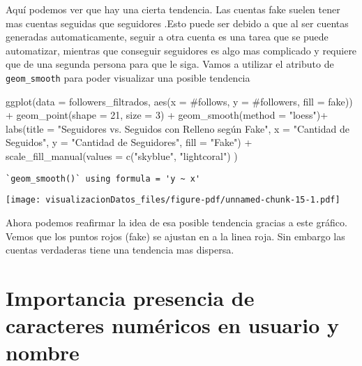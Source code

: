\documentclass[
  letterpaper,
  DIV=11,
  numbers=noendperiod]{scrreprt}
\newenvironment{Shaded}{\begin{snugshade}}{\end{snugshade}}
\newcommand{\AttributeTok}[1]{\textcolor[rgb]{0.40,0.45,0.13}{#1}}
\newcommand{\DecValTok}[1]{\textcolor[rgb]{0.68,0.00,0.00}{#1}}
\newcommand{\FunctionTok}[1]{\textcolor[rgb]{0.28,0.35,0.67}{#1}}
\newcommand{\NormalTok}[1]{\textcolor[rgb]{0.00,0.23,0.31}{#1}}
\newcommand{\SpecialCharTok}[1]{\textcolor[rgb]{0.37,0.37,0.37}{#1}}
\newcommand{\StringTok}[1]{\textcolor[rgb]{0.13,0.47,0.30}{#1}}
\begin{document}
Aquí podemos ver que hay una cierta tendencia. Las cuentas fake suelen
tener mas cuentas seguidas que seguidores .Esto puede ser debido a que
al ser cuentas generadas automaticamente, seguir a otra cuenta es una
tarea que se puede automatizar, mientras que conseguir seguidores es
algo mas complicado y requiere que de una segunda persona para que le
siga. Vamos a utilizar el atributo de \texttt{geom\_smooth} para poder
visualizar una posible tendencia

\begin{Shaded}
\begin{Highlighting}[]
\FunctionTok{ggplot}\NormalTok{(}\AttributeTok{data =}\NormalTok{ followers\_filtrados, }\FunctionTok{aes}\NormalTok{(}\AttributeTok{x =} \StringTok{\textasciigrave{}}\AttributeTok{\#follows}\StringTok{\textasciigrave{}}\NormalTok{, }\AttributeTok{y =} \StringTok{\textasciigrave{}}\AttributeTok{\#followers}\StringTok{\textasciigrave{}}\NormalTok{, }\AttributeTok{fill =}\NormalTok{ fake)) }\SpecialCharTok{+}
  \FunctionTok{geom\_point}\NormalTok{(}\AttributeTok{shape =} \DecValTok{21}\NormalTok{, }\AttributeTok{size =} \DecValTok{3}\NormalTok{) }\SpecialCharTok{+}
   \FunctionTok{geom\_smooth}\NormalTok{(}\AttributeTok{method =} \StringTok{"loess"}\NormalTok{)}\SpecialCharTok{+}
  \FunctionTok{labs}\NormalTok{(}\AttributeTok{title =} \StringTok{"Seguidores vs. Seguidos con Relleno según \textquotesingle{}Fake\textquotesingle{}"}\NormalTok{,}
       \AttributeTok{x =} \StringTok{"Cantidad de Seguidos"}\NormalTok{,}
       \AttributeTok{y =} \StringTok{"Cantidad de Seguidores"}\NormalTok{,}
       \AttributeTok{fill =} \StringTok{"Fake"}\NormalTok{) }\SpecialCharTok{+}
  \FunctionTok{scale\_fill\_manual}\NormalTok{(}\AttributeTok{values =} \FunctionTok{c}\NormalTok{(}\StringTok{"skyblue"}\NormalTok{, }\StringTok{"lightcoral"}\NormalTok{) )}
\end{Highlighting}
\end{Shaded}

\begin{verbatim}
`geom_smooth()` using formula = 'y ~ x'
\end{verbatim}

\texttt{[image: visualizacionDatos\_files/figure-pdf/unnamed-chunk-15-1.pdf]}

Ahora podemos reafirmar la idea de esa posible tendencia gracias a este
gráfico. Vemos que los puntos rojos (fake) se ajustan en a la linea
roja. Sin embargo las cuentas verdaderas tiene una tendencia mas
dispersa.

\section{Importancia presencia de caracteres numéricos en usuario y
nombre}\label{importancia-presencia-de-caracteres-numuxe9ricos-en-usuario-y-nombre}
\end{document}
